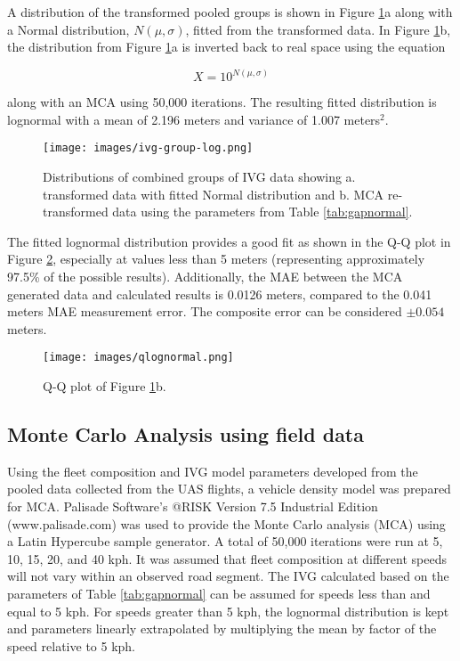 A distribution of the transformed pooled groups is shown in Figure \ref{fig:ivgloggroup}a along with a Normal distribution, $N(\mu,\sigma)$, fitted from the transformed data. In Figure \ref{fig:ivgloggroup}b, the distribution from Figure \ref{fig:ivgloggroup}a is inverted back to real space using the equation

\begin{equation}
\label{inverse-10}
X = 10^{N(\mu,\sigma)}
\end{equation}

along with an MCA using 50,000 iterations. The resulting fitted distribution is lognormal with a mean of 2.196 meters and variance of 1.007 meters$^{2}$. 
 
\begin{figure}[!htb]
\texttt{[image: images/ivg-group-log.png]} 
\caption[Distributions of combined groups of IVG data.]{Distributions of combined groups of IVG data showing a. transformed data with fitted Normal distribution and b. MCA re-transformed data using the parameters from Table \ref{tab:gapnormal}.}
\label{fig:ivgloggroup}
\end{figure}

The fitted lognormal distribution provides a good fit as shown in the Q-Q plot in Figure \ref{fig:qlognormal}, especially at values less than 5 meters (representing approximately 97.5\% of the possible results). Additionally, the MAE between the MCA generated data and calculated  results is 0.0126 meters, compared to the 0.041 meters MAE measurement error. The composite error can be considered $\pm 0.054$ meters.

\begin{figure}[!htb]
\texttt{[image: images/qlognormal.png]} 
\caption{Q-Q plot of Figure \ref{fig:ivgloggroup}b.}
\label{fig:qlognormal}
\end{figure}


\clearpage
\subsection{Monte Carlo Analysis using field data}
Using the fleet composition and IVG model parameters developed from the pooled data collected from the UAS flights, a vehicle density model was prepared for MCA. Palisade Software’s @RISK Version 7.5 Industrial Edition (www.palisade.com) was used to provide the Monte Carlo analysis (MCA) using a Latin Hypercube sample generator.  A total of 50,000 iterations were run at 5, 10, 15, 20, and 40 kph. It was assumed that fleet composition at different speeds will not vary within an observed road segment. The IVG calculated based on the parameters of Table \ref{tab:gapnormal} can be assumed for speeds less than and equal to 5 kph. For speeds greater than 5 kph, the lognormal distribution is kept and parameters linearly extrapolated by multiplying the mean by factor of the speed relative to 5 kph.  

